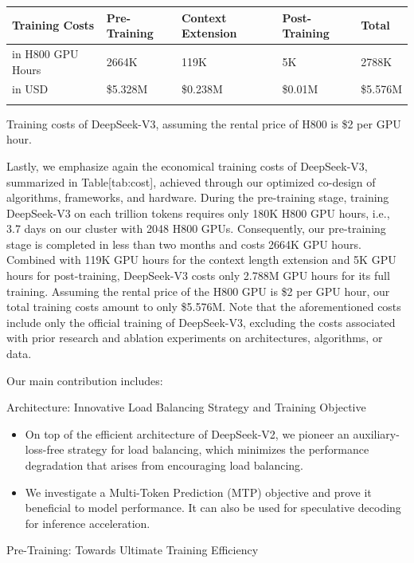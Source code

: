 \documentclass[11pt,a4paper]{article}
\begin{document}
\begin{table}[h]
\begin{tabular}{|l|l|l|l|l|}
\hline
Training Costs & Pre-Training & Context Extension & Post-Training & Total \\ \hline
in H800 GPU Hours & 2664K & 119K & 5K & 2788K \\ \hline
in USD & \$5.328M & \$0.238M & \$0.01M & \$5.576M \\ \hline
 &  &  &  &  \\ \hline
\end{tabular}
\end{table}

Training costs of DeepSeek-V3, assuming the rental price of H800 is \$2 per GPU hour.

Lastly, we emphasize again the economical training costs of DeepSeek-V3, summarized in Table[tab:cost], achieved through our optimized co-design of algorithms, frameworks, and hardware. 
During the pre-training stage, training DeepSeek-V3 on each trillion tokens requires only 180K H800 GPU hours, i.e., 3.7 days on our cluster with 2048 H800 GPUs. 
Consequently, our pre-training stage is completed in less than two months and costs 2664K GPU hours.
Combined with 119K GPU hours for the context length extension and 5K GPU hours for post-training, DeepSeek-V3 costs only 2.788M GPU hours for its full training. 
Assuming the rental price of the H800 GPU is \$2 per GPU hour, our total training costs amount to only \$5.576M.
Note that the aforementioned costs include only the official training of DeepSeek-V3, excluding the costs associated with prior research and ablation experiments on architectures, algorithms, or data.

Our main contribution includes:

Architecture: Innovative Load Balancing Strategy and Training Objective

\begin{itemize}
\item On top of the efficient architecture of DeepSeek-V2, we pioneer an auxiliary-loss-free strategy for load balancing, which minimizes the performance degradation that arises from encouraging load balancing.
\item We investigate a Multi-Token Prediction (MTP) objective and prove it beneficial to model performance. 
    It can also be used for speculative decoding for inference acceleration.
\end{itemize}

Pre-Training: Towards Ultimate Training Efficiency
\end{document}
